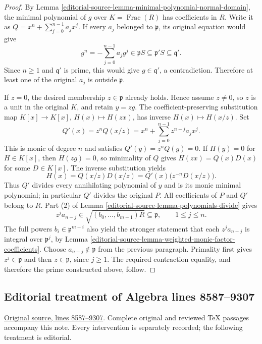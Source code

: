 \begin{proof}
\medskip\noindent
By Lemma \ref{editorial-source-lemma-minimal-polynomial-normal-domain}, the
minimal polynomial of $g$ over $K=\operatorname{Frac}(R)$ has
coefficients in $R$. Write it as
$Q=x^n+\sum_{j=0}^{n-1}a_jx^j$. If every $a_j$ belonged to
$\mathfrak p$, its original equation would give
$$
g^n=-\sum_{j=0}^{n-1}a_jg^j\in\mathfrak pS
\subseteq\mathfrak p'S\subseteq\mathfrak q'.
$$
Since $n\geq1$ and $\mathfrak q'$ is prime, this would give
$g\in\mathfrak q'$, a contradiction. Therefore at least one
of the original $a_j$ is outside $\mathfrak p$.

\medskip\noindent
If $z=0$, the desired membership $z\in\mathfrak p$ already
holds. Hence assume $z\ne0$, so $z$ is a unit in the original
$K$, and retain $y=zg$. The coefficient-preserving substitution
map $K[x]\to K[x]$, $H(x)\mapsto H(zx)$, has inverse
$H(x)\mapsto H(x/z)$. Set
$$
Q'(x)=z^nQ(x/z)
=x^n+\sum_{j=0}^{n-1}z^{n-j}a_jx^j.
$$
This is monic of degree $n$ and satisfies
$Q'(y)=z^nQ(g)=0$. If $H(y)=0$ for $H\in K[x]$, then
$H(zg)=0$, so minimality of $Q$ gives $H(zx)=Q(x)D(x)$
for some $D\in K[x]$. The inverse substitution yields
$$
H(x)=Q(x/z)D(x/z)=Q'(x)\bigl(z^{-n}D(x/z)\bigr).
$$
Thus $Q'$ divides every annihilating polynomial of $y$ and is
its monic minimal polynomial; in particular $Q'$ divides the
original $P$. All coefficients of $P$ and $Q'$ belong to $R$.
Part (2) of Lemma \ref{editorial-source-lemma-polynomials-divide} gives
$$
z^ja_{n-j}\in\sqrt{(b_0,\ldots,b_{m-1})R}
\subseteq\mathfrak p,\qquad 1\leq j\leq n.
$$
The full powers $b_i\in\mathfrak p^{m-i}$ also yield the
stronger statement that each $z^ja_{n-j}$ is integral over
$\mathfrak p^j$, by
Lemma \ref{editorial-source-lemma-weighted-monic-factor-coefficients}.
Choose $a_{n-j}\notin\mathfrak p$ from the previous paragraph.
Primality first gives $z^j\in\mathfrak p$ and then
$z\in\mathfrak p$, since $j\geq1$. The required contraction
equality, and therefore the prime constructed above, follow.
\end{proof}


\subsection{Editorial treatment of Algebra lines 8587--9307}

\hypertarget{algebra-context-097}{}

\noindent\href{https://github.com/stacks/stacks-project/blob/a04446e57ec1fbc252a871afcec7752fb2807b14/algebra.tex\#L8587}{Original source, lines 8587--9307}. Complete original and reviewed TeX passages accompany this note. Every intervention is separately recorded; the following treatment is editorial.


